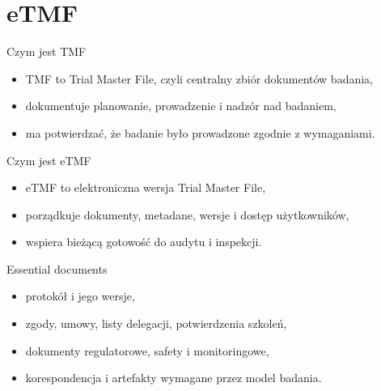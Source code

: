 \section{eTMF}


\begin{frame}{Czym jest TMF}
  \begin{itemize}
    \item TMF to Trial Master File, czyli centralny zbiór dokumentów badania,
    \item dokumentuje planowanie, prowadzenie i nadzór nad badaniem,
    \item ma potwierdzać, że badanie było prowadzone zgodnie z wymaganiami.
  \end{itemize}
\end{frame}

\begin{frame}{Czym jest eTMF}
  \begin{itemize}
    \item eTMF to elektroniczna wersja Trial Master File,
    \item porządkuje dokumenty, metadane, wersje i dostęp użytkowników,
    \item wspiera bieżącą gotowość do audytu i inspekcji.
  \end{itemize}
\end{frame}

\begin{frame}{Essential documents}
  \begin{itemize}
    \item protokół i jego wersje,
    \item zgody, umowy, listy delegacji, potwierdzenia szkoleń,
    \item dokumenty regulatorowe, safety i monitoringowe,
    \item korespondencja i artefakty wymagane przez model badania.
  \end{itemize}
\end{frame}

